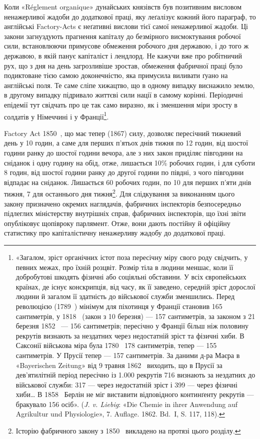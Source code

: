 Коли «Réglement organique» дунайських князівств був позитивним
висловом ненажерливої жадоби до додаткової праці, яку
леґалізує кожний його параграф, то англійські Factory-Acts
є неґативні вислови тієї самої ненажерливої жадоби. Ці закони
загнуздують прагнення капіталу до безмірного висмоктування
робочої сили, встановлюючи примусове обмеження робочого дня
державою, і до того ж державою, в якій панує капіталіст і лендлорд.
Не кажучи вже про робітничий рух, що з дня на день загрозливіше
зростав, обмеження фабричної праці було подиктоване
тією самою доконечністю, яка примусила виливати ґуано
на англійські поля. Те саме сліпе хижацтво, що в одному випадку
виснажило землю, в другому випадку підривало життєві сили
нації в самому корінні. Періодичні епідемії тут свідчать про це
так само виразно, як і зменшення міри зросту в солдатів у Німеччині
і у Франції\footnote{
«Загалом, зріст органічних істот поза пересічну міру свого роду
свідчить, у певних межах, про їхній розцвіт. Розмір тіла в людини меншає,
коли її добробутові шкодять фізичні або соціяльні обставини. У всіх європейських
країнах, де існує конскрипція, від часу, як її заведено, середній
зріст дорослої людини й загалом її здатність до військової служби зменшились.
Перед революцією (1789~) мінімум для піхотинця у Франції
становив 165 сантиметрів, у 1818~ (закон з 10 березня) — 157 сантиметрів,
за законом з 21 березня 1852~ — 156 сантиметрів; пересічно у Франції
більш ніж половину рекрутів визнають за нездатних через недостатній
зріст та фізичні хиби. В Саксонії військова міра була 1780~ 178 сантиметрів,
тепер — 155 сантиметрів. У Прусії тепер — 157 сантиметрів. За даними
д-ра Маєра в «Bayerischen Zeitung» від 9 травня 1862~ виходить,
що в Прусії за дев’ятилітній період пересічно із \num{1.000} рекрутів 716 визнають
за нездатних до військової служби: 317 — через недостатній зріст і
399 — через фізичні хиби\dots{} В 1858~ Берлін не міг виставити відповідного
континґенту рекрутів — бракувало 156 осіб». (\emph{J. v. Liebig}: «Die
Chemie in ihrer Anwendung auf Agrikultur und Physiologie», 7. Auflage.
1862. Bd.~I, S. 117, 118).
}.

Factory Act 1850~, що має тепер (1867) силу, дозволяє пересічний
тижневий день у 10 годин, а саме для перших п’ятьох
днів тижня по 12 годин, від шостої години ранку до шостої години
вечора, але з них закон приділяє півгодини на сніданок і
одну годину на обід, отже, лишається 10\% робочих годин, і для
суботи 8 годин, від шостої години ранку до другої години по
півдні, з чого півгодини відпадає на сніданок. Лишається 60 робочих
годин, по 10 для перших п’яти днів тижня, 7 для
останнього дня тижня\footnote{
Історію фабричного закону з 1850~ викладено на протязі цього
розділу.
}. Для слідкування за виконанням цього
закону призначено окремих наглядачів, фабричних інспекторів
безпосередньо підлеглих міністерству внутрішніх справ, фабричних
інспекторів, що їхні звіти опубліковує щопівроку парлямент.
Отже, вони дають постійну й офіційну статистику про капіталістичну
ненажерливу жадобу до додаткової праці.

